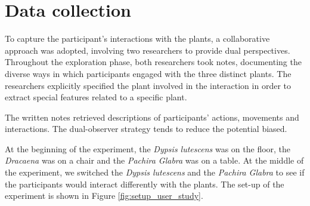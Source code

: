 \section{Data collection}

To capture the participant's interactions with the plants, a collaborative approach was adopted, involving two researchers to provide dual perspectives.
Throughout the exploration phase, both researchers took notes, documenting the diverse ways in which participants engaged with the three distinct plants.
The researchers explicitly specified the plant involved in the interaction in order to extract special features related to a specific plant.

The written notes retrieved descriptions of participants' actions, movements and interactions.
The dual-observer strategy tends to reduce the potential biased.

At the beginning of the experiment, the \textit{Dypsis lutescens} was on the floor, the \textit{Dracaena} was on a chair and the \textit{Pachira Glabra} was on a table.
At the middle of the experiment, we switched the \textit{Dypsis lutescens} and the \textit{Pachira Glabra} to see if the participants would interact differently with the plants.
The set-up of the experiment is shown in Figure \ref{fig:setup_user_study}. 